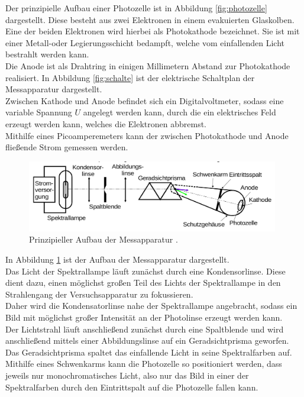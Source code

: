 Der prinzipielle Aufbau einer Photozelle ist in Abbildung \ref{fig:photozelle} dargestellt.
Diese besteht aus zwei Elektronen in einem evakuierten Glaskolben.\\ Eine der beiden Elektronen wird hierbei als Photokathode bezeichnet. Sie ist mit einer Metall-oder Legierungsschicht bedampft, welche vom einfallenden Licht bestrahlt werden kann.\\
Die Anode ist als Drahtring in einigen Millimetern Abstand zur Photokathode realisiert.
In Abbildung \ref{fig:schalte} ist der elektrische Schaltplan der Messapparatur dargestellt.\\
Zwischen Kathode und Anode befindet sich ein Digitalvoltmeter, sodass eine variable Spannung $U$ angelegt werden kann, durch die ein elektrisches Feld erzeugt werden kann, welches die Elektronen abbremst.\\
Mithilfe eines Picoamperemeters kann der zwischen Photokathode und Anode fließende Strom gemessen werden.\\
\begin{figure}
  \centering
  \includegraphics[width=0.98\textwidth]{Bilder/versuchsaufbau.png}
  \caption{Prinzipieller Aufbau der Messapparatur \cite{Anleitung}.}
  \label{fig:aufbau}
\end{figure}
In Abbildung \ref{fig:aufbau} ist der Aufbau der Messapparatur dargestellt.\\
Das Licht der Spektrallampe läuft zunächst durch eine Kondensorlinse. Diese dient dazu, einen möglichst großen Teil des Lichts der Spektrallampe in den Strahlengang der Versuchsapparatur zu fokussieren.\\
Daher wird die Kondensatorlinse nahe der Spektrallampe angebracht, sodass ein Bild mit möglichst großer Intensität an der Photolinse erzeugt werden kann.\\ Der Lichtstrahl läuft anschließend zunächst durch eine Spaltblende und wird anschließend mittels einer Abbildungslinse auf ein Geradsichtprisma geworfen. Das Geradsichtprisma spaltet das einfallende Licht in seine Spektralfarben auf.\\
Mithilfe eines Schwenkarms kann die Photozelle so positioniert werden, dass jeweils nur monochromatisches Licht, also nur das Bild in einer der Spektralfarben durch den Eintrittspalt auf die Photozelle fallen kann.

